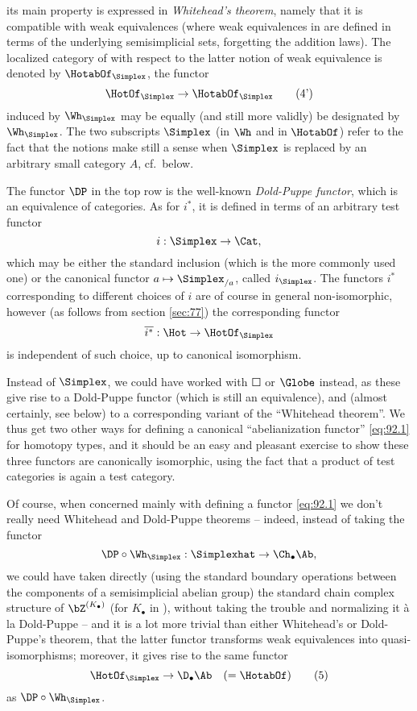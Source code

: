 its main property is expressed in \emph{Whitehead's theorem}, namely
that it is compatible with weak equivalences (where weak equivalences
in \Simplexhatab{} are defined in terms of the underlying
semisimplicial sets, forgetting the addition laws). The localized
category of \Simplexhatab{} with respect to the latter notion of weak
equivalence is denoted by $\HotabOf_\Simplex$, the functor
\begin{equation}
  \label{eq:92.4prime}
  \HotOf_\Simplex \to \HotabOf_\Simplex\tag{4'}
\end{equation}
induced by $\Wh_\Simplex$ may be equally (and still more validly) be
designated by $\Wh_\Simplex$. The two subscripts $\Simplex$ (in $\Wh$
and in $\HotabOf$) refer to the fact that the notions make still a
sense when $\Simplex$ is replaced by an arbitrary small category $A$,
cf.\ below.

The functor $\DP$ in the top row is the well-known \emph{Dold-Puppe
  functor}, which is an equivalence of categories. As for $i^*$, it is
defined in terms of an arbitrary test functor
\[i:\Simplex\to\Cat,\]
which may be either the standard inclusion (which is the more commonly
used one) or the canonical functor $a\mapsto\Simplex_{/a}$, called
$i_\Simplex$. The functors $i^*$ corresponding to different choices of
$i$ are of course in general non-isomorphic, however (as follows from
section \ref{sec:77}) the corresponding functor
\[\overline{i^*}:\Hot\to\HotOf_\Simplex\]
is independent of such choice, up to canonical isomorphism.

Instead of $\Simplex$, we could have worked with $\Square$ or $\Globe$
instead, as these give rise to a Dold-Puppe functor (which is still an
equivalence), and (almost certainly, see below) to a corresponding
variant of the ``Whitehead theorem''. We thus get two other ways for
defining a canonical ``abelianization functor'' \eqref{eq:92.1} for
homotopy types, and it should be an easy and pleasant exercise to show
these three functors are canonically isomorphic, using the fact that a
product of test categories is again a test category.

\begin{remark}
  Of course, when concerned mainly with defining a functor
  \eqref{eq:92.1} we don't really need Whitehead and Dold-Puppe
  theorems -- indeed, instead of taking the functor
  \[\DP\circ\Wh_\Simplex:\Simplexhat\to\Ch_\bullet\Ab,\]
  we could have taken directly (using the standard boundary operations
  between the components of a semisimplicial abelian group) the
  standard chain complex structure of $\bZ^{(K_\bullet)}$ (for
  $K_\bullet$ in \Simplexhat), without taking the trouble and
  normalizing it à la Dold-Puppe -- and it is a lot more trivial than
  either Whitehead's or Dold-Puppe's theorem, that the latter functor
  transforms weak equivalences into quasi-isomorphisms; moreover, it
  gives rise to the same functor
  \begin{equation}
    \label{eq:92.5}
    \HotOf_\Simplex\to\D_\bullet\Ab\quad(=\HotabOf)\tag{5}
  \end{equation}
  as $\DP\circ\Wh_\Simplex$.
\end{remark}

